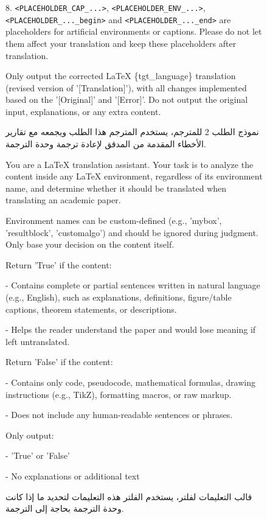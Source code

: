 \documentclass[11pt]{article}
\begin{document}
\begin{figure}[htbp]
\begin{tcolorbox}[title=Prompt Template 2 for Translator, halign=left]
8. \texttt{<PLACEHOLDER\_CAP\_...>}, \texttt{<PLACEHOLDER\_ENV\_...>}, \texttt{<PLACEHOLDER\_...\_begin>} and \texttt{<PLACEHOLDER\_...\_end>} are placeholders for artificial environments or captions. Please do not let them affect your translation and keep these placeholders after translation.

\vspace{2mm}
Only output the corrected LaTeX \{tgt\_language\} translation (revised version of '[Translation]'), with all changes implemented based on the '[Original]' and '[Error]'. Do not output the original input, explanations, or any extra content.

\end{tcolorbox}
\caption{نموذج الطلب 2 للمترجم، يستخدم المترجم هذا الطلب ويجمعه مع تقارير الأخطاء المقدمة من المدقق لإعادة ترجمة وحدة الترجمة.}
    \label{fig:translation prompt 2}
\end{figure}

\begin{figure}[htbp]
    \centering
\begin{tcolorbox}[title=Prompt Template for Filter, halign=left]
\small
\ttfamily
You are a LaTeX translation assistant. Your task is to analyze the content inside any LaTeX environment, regardless of its environment name, and determine whether it should be translated when translating an academic paper.

Environment names can be custom-defined (e.g., 'mybox', 'resultblock', 'customalgo') and should be ignored during judgment. Only base your decision on the content itself.

\vspace{2mm}
Return 'True' if the content:

- Contains complete or partial sentences written in natural language (e.g., English), such as explanations, definitions, figure/table captions, theorem statements, or descriptions.

- Helps the reader understand the paper and would lose meaning if left untranslated.

\vspace{2mm}
Return 'False' if the content:

- Contains only code, pseudocode, mathematical formulas, drawing instructions (e.g., TikZ), formatting macros, or raw markup.

- Does not include any human-readable sentences or phrases.

\vspace{2mm}
Only output:

- 'True' or 'False'

- No explanations or additional text

\end{tcolorbox}
\caption{قالب التعليمات لفلتر، يستخدم الفلتر هذه التعليمات لتحديد ما إذا كانت وحدة الترجمة بحاجة إلى الترجمة.}
    \label{fig:filter prompt}
\end{figure}
\end{document}
